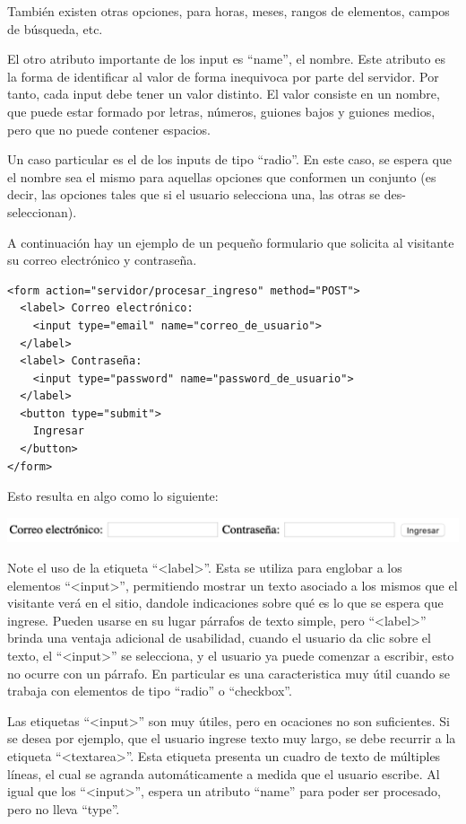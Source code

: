 También existen otras opciones, para horas, meses, rangos de elementos, campos
de búsqueda, etc.

El otro atributo importante de los input es ``name'', el nombre. Este atributo
es la forma de identificar al valor de forma inequivoca por parte del servidor.
Por tanto, cada input debe tener un valor distinto. El valor consiste en un
nombre, que puede estar formado por letras, números, guiones bajos y guiones
medios, pero que no puede contener espacios.

Un caso particular es el de los inputs de tipo ``radio''. En este caso, se espera
que el nombre sea el mismo para aquellas opciones que conformen un conjunto (es
decir, las opciones tales que si el usuario selecciona una, las otras se
des-seleccionan).

A continuación hay un ejemplo de un pequeño formulario que solicita al visitante
su correo electrónico y contraseña.

\begin{lstlisting}[language=XHTML]
<form action="servidor/procesar_ingreso" method="POST">
  <label> Correo electrónico:
    <input type="email" name="correo_de_usuario">
  </label>
  <label> Contraseña:
    <input type="password" name="password_de_usuario">
  </label>
  <button type="submit">
    Ingresar
  </button>
</form>
\end{lstlisting}

Esto resulta en algo como lo siguiente:

\includegraphics[scale=0.7]{apendices/html/imagenes/form_sample_login.png}

Note el uso de la etiqueta ``<label>''. Esta se utiliza para englobar a los
elementos ``<input>'', permitiendo mostrar un texto asociado a los mismos
que el visitante verá en el sitio, dandole indicaciones sobre qué es lo que
se espera que ingrese. Pueden usarse en su lugar párrafos de texto simple,
pero ``<label>'' brinda una ventaja adicional de usabilidad, cuando el
usuario da clic sobre el texto, el ``<input>'' se selecciona, y el usuario
ya puede comenzar a escribir, esto no ocurre con un párrafo. En particular
es una caracteristica muy útil cuando se trabaja con elementos de tipo
``radio'' o ``checkbox''.

Las etiquetas ``<input>'' son muy útiles, pero en ocaciones no son suficientes.
Si se desea por ejemplo, que el usuario ingrese texto muy largo, se debe recurrir
a la etiqueta ``<textarea>''. Esta etiqueta presenta un cuadro de texto de
múltiples líneas, el cual se agranda automáticamente a medida que el usuario
escribe. Al igual que los ``<input>'', espera un atributo ``name'' para poder
ser procesado, pero no lleva ``type''.

